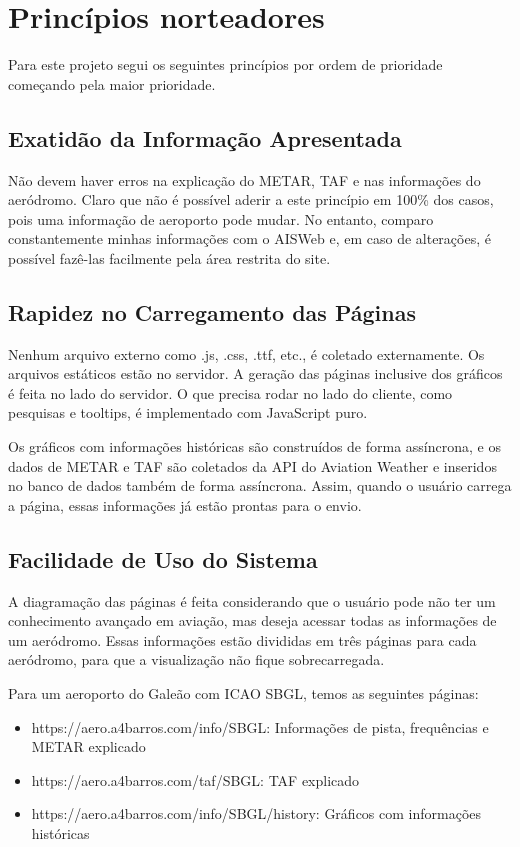 \chapter{Princípios norteadores}

Para este projeto segui os seguintes princípios por ordem de prioridade começando pela maior
prioridade.

\section{Exatidão da Informação Apresentada}
Não devem haver erros na explicação do METAR, TAF e nas informações do aeródromo. Claro que não
é possível aderir a este princípio em 100\% dos casos, pois uma informação de aeroporto pode mudar.
No entanto, comparo constantemente minhas informações com o AISWeb e, em caso de alterações,
é possível fazê-las facilmente pela área restrita do site.

\section{Rapidez no Carregamento das Páginas} Nenhum arquivo externo como .js, .css, .ttf, etc., 
é coletado externamente. Os arquivos estáticos estão no servidor. A geração das páginas inclusive dos
gráficos é feita
no lado do servidor.
O que precisa rodar no lado do cliente, como pesquisas e tooltips, é
implementado com JavaScript puro.

Os gráficos com informações históricas são construídos de forma assíncrona, e os dados de METAR
e TAF são coletados da API do Aviation Weather e inseridos no banco de dados também de forma
assíncrona. Assim, quando o usuário carrega a página, essas informações já estão prontas para o envio.

\section{Facilidade de Uso do Sistema} A diagramação das páginas é feita considerando que o usuário
pode não ter um conhecimento avançado em aviação, mas deseja acessar todas as informações de um
aeródromo. Essas informações estão divididas em três páginas para cada aeródromo, para que a
visualização não fique sobrecarregada.

Para um aeroporto do Galeão com ICAO SBGL, temos as seguintes páginas:

\begin{itemize}
    \item https://aero.a4barros.com/info/SBGL: Informações de pista, frequências e METAR explicado
    \item https://aero.a4barros.com/taf/SBGL: TAF explicado
    \item https://aero.a4barros.com/info/SBGL/history: Gráficos com informações históricas
\end{itemize}